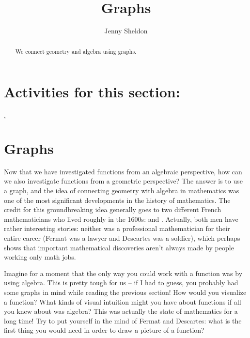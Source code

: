 \documentclass{ximera}
\title{Graphs}
\author{Jenny Sheldon}
\begin{document}
\begin{abstract}
We connect geometry and algebra using graphs.
\end{abstract}
\maketitle

\section{Activities for this section:} 
, 



\section{Graphs}




Now that we have investigated functions from an algebraic perspective, how can we also investigate functions from a geometric perspective? The answer is to use a graph, and the idea of connecting geometry with algebra in mathematics was one of the most significant developments in the history of mathematics. The credit for this groundbreaking idea generally goes to two different French mathematicians who lived roughly in the 1600s:  and . Actually, both men have rather interesting stories: neither was a professional mathematician for their entire career (Fermat was a lawyer and Descartes was a soldier), which perhaps shows that important mathematical discoveries aren't always made by people working only math jobs.

Imagine for a moment that the only way you could work with a function was by using algebra. This is pretty tough for us -- if I had to guess, you probably had some graphs in mind while reading the previous section! How would you visualize a function? What kinds of visual intuition might you have about functions if all you knew about was algebra? This was actually the state of mathematics for a long time! Try to put yourself in the mind of Fermat and Descartes: what is the first thing you would need in order to draw a picture of a function?
\end{document}
